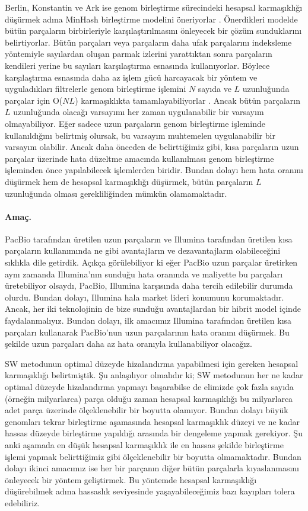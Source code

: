 Berlin, Konstantin ve Ark ise genom birleştirme sürecindeki hesapsal karmaşıklığı düşürmek adına MinHash birleştirme modelini öneriyorlar \cite{Berlin2015}. Önerdikleri modelde bütün parçaların birbirleriyle karşılaştırılmasını önleyecek bir çözüm sunduklarını belirtiyorlar. Bütün parçaları veya parçaların daha ufak parçalarını indeksleme yöntemiyle sayılardan oluşan parmak izlerini yarattıktan sonra parçaların kendileri yerine bu sayıları karşılaştırma esnasında kullanıyorlar. Böylece karşılaştırma esnasında daha az işlem gücü harcayacak bir yöntem ve uyguladıkları filtrelerle genom birleştirme işlemini $N$ sayıda ve $L$ uzunluğunda parçalar için O($N$$L$) karmaşıklıkta tamamlayabiliyorlar \cite{Berlin2015}. Ancak bütün parçaların $L$ uzunluğunda olacağı varsayımı her zaman uygulanabilir bir varsayım olmayabiliyor. Eğer sadece uzun parçaların genom birleştirme işleminde kullanıldığını belirtmiş olursak, bu varsayım muhtemelen uygulanabilir bir varsayım olabilir. Ancak daha önceden de belirttiğimiz gibi, kısa parçaların uzun parçalar üzerinde hata düzeltme amacında kullanılması genom birleştirme işleminden önce yapılabilecek işlemlerden biridir. Bundan dolayı hem hata oranını düşürmek hem de hesapsal karmaşıklığı düşürmek, bütün parçaların $L$ uzunluğunda olması gerekliliğinden mümkün olamamaktadır.

\paragraph{Amaç.}

PacBio tarafından üretilen uzun parçaların ve Illumina tarafından üretilen kısa parçaların kullanımında ne gibi avantajların ve dezavantajların olabileceğini sıklıkla dile getirdik. Açıkça görülebiliyor ki eğer PacBio uzun parçalar üretirken aynı zamanda Illumina'nın sunduğu hata oranında ve maliyette bu parçaları üretebiliyor olsaydı, PacBio, Illumina karşısında daha tercih edilebilir durumda olurdu. Bundan dolayı, Illumina hala market lideri konumunu korumaktadır. Ancak, her iki teknolojinin de bize sunduğu avantajlardan bir hibrit model içinde faydalanmalıyız. Bundan dolayı, ilk amacımız Illumina tarafından üretilen kısa parçaları kullanarak PacBio'nun uzun parçalarının hata oranını düşürmek. Bu şekilde uzun parçaları daha az hata oranıyla kullanabiliyor olacağız.

SW metodunun optimal düzeyde hizalandırma yapabilmesi için gereken hesapsal karmaşıklığı belirtmiştik. Şu anlaşılıyor olmalıdır ki; SW metodunun her ne kadar optimal düzeyde hizalandırma yapmayı başarabilse de elimizde çok fazla sayıda (örneğin milyarlarca) parça olduğu zaman hesapsal karmaşıklığı bu milyarlarca adet parça üzerinde ölçeklenebilir bir boyutta olamıyor. Bundan dolayı büyük genomları tekrar birleştirme aşamasında hesapsal karmaşıklık düzeyi ve ne kadar hassas düzeyde birleştirme yapıldığı arasında bir dengeleme yapmak gerekiyor. Şu anki aşamada en düşük hesapsal karmaşıklık ile en hassas şekilde birleştirme işlemi yapmak belirttiğimiz gibi ölçeklenebilir bir boyutta olmamaktadır. Bundan dolayı ikinci amacımız ise her bir parçanın diğer bütün parçalarla kıyaslanmasını önleyecek bir yöntem geliştirmek. Bu yöntemde hesapsal karmaşıklığı düşürebilmek adına hassaslık seviyesinde yaşayabileceğimiz bazı kayıpları tolera edebiliriz.


